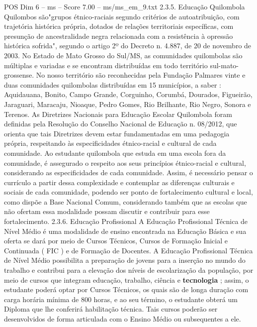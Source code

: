 \begin{textsample}{POS Dim 6 – ms – Score 7.00 – ms/ms\_em\_9.txt}  \label{ex:f6_pos_060}
2.3.5.
Educação Quilombola Quilombos são"grupos étnico-raciais segundo critérios de autoatribuição, com trajetória histórica própria, dotados de relações territoriais específicas, com presunção de ancestralidade negra relacionada com a resistência à opressão histórica sofrida", segundo o artigo 2º do Decreto n. 4.887, de 20 de novembro de 2003.
No Estado de Mato Grosso do Sul/MS, as comunidades quilombolas são múltiplas e variadas e se encontram distribuídas em todo território sul-mato-grossense.
No nosso território são reconhecidas pela Fundação Palmares vinte e duas comunidades quilombolas distribuídas em 15 municípios, a saber : Aquidauana, Bonito, Campo Grande, Corguinho, Corumbá, Dourados, Figueirão, Jaraguari, Maracaju, Nioaque, Pedro Gomes, Rio Brilhante, Rio Negro, Sonora e Terenos.
As Diretrizes Nacionais para Educação Escolar Quilombola foram definidas pela Resolução do Conselho Nacional de Educação n. 08/2012, que orienta que tais Diretrizes devem estar fundamentadas em uma pedagogia própria, respeitando às especificidades étnico-racial e cultural de cada comunidade.
Ao estudante quilombola que estuda em uma escola fora da comunidade, é assegurado o respeito aos seus princípios étnico-racial e cultural, considerando as especificidades de cada comunidade.
Assim, é necessário pensar o currículo a partir dessa complexidade e contemplar as diferenças culturais e sociais de cada comunidade, podendo ser ponto de fortalecimento cultural e local, como dispõe a Base Nacional Comum, considerando também que as escolas que não ofertam essa modalidade possam discutir e contribuir para esse fortalecimento. 2.3.6.
Educação Profissional A Educação Profissional Técnica de Nível Médio é uma modalidade de ensino encontrada na Educação Básica e sua oferta se dará por meio de Cursos Técnicos, Cursos de Formação Inicial e Continuada ( FIC ) e de Formação de Docentes.
A Educação Profissional Técnica de Nível Médio possibilita a preparação de jovens para a inserção no mundo do trabalho e contribui para a elevação dos níveis de escolarização da população, por meio de cursos que integram educação, trabalho, ciência e \textbf{tecnologia} ; assim, o estudante poderá optar por Cursos Técnicos, os quais são de longa duração com carga horária mínima de 800 horas, e ao seu término, o estudante obterá um Diploma que lhe conferirá habilitação técnica.
Tais cursos poderão ser desenvolvidos de forma articulada com o Ensino Médio ou subsequentes a ele.

\end{textsample}
